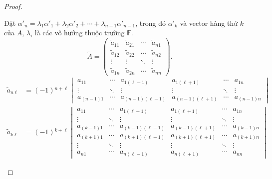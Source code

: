 \documentclass[class=linearalgebra,crop=false]{standalone}
\begin{document}
\begin{proof}
\begin{enumerate}[label = \textbf{Trường hợp \arabic*.},itemindent=2cm]
              \par Đặt $\alpha'_{n} = \lambda_{1}\alpha'_{1} + \lambda_{2}\alpha'_{2} + \cdots + \lambda_{n-1}\alpha'_{n-1}$, trong đó $\alpha'_{k}$ và vector hàng thứ $k$ của $A$, $\lambda_{i}$ là các vô hướng thuộc trường $\mathbb{F}$.
              \[
                  \tilde{A} =
                  \begin{pmatrix}
                      \tilde{a}_{11} & \tilde{a}_{21} & \cdots & \tilde{a}_{n1} \\
                      \tilde{a}_{12} & \tilde{a}_{22} & \cdots & \tilde{a}_{n2} \\
                      \vdots         & \vdots         & \ddots & \vdots         \\
                      \tilde{a}_{1n} & \tilde{a}_{2n} & \cdots & \tilde{a}_{nn}
                  \end{pmatrix}.
              \]
              \begin{align*}
                  \tilde{a}_{n\ell} & = (-1){}^{n+\ell}
                  \begin{vmatrix}
                      a_{11}     & \cdots & a_{1(\ell-1)}     & a_{1(\ell+1)}     & \cdots & a_{1n}     \\
                      \vdots     & \ddots & \vdots            & \vdots            & \ddots & \vdots     \\
                      a_{(n-1)1} & \cdots & a_{(n-1)(\ell-1)} & a_{(n-1)(\ell+1)} & \cdots & a_{(n-1)n}
                  \end{vmatrix}                             \\
                  \tilde{a}_{k\ell} & = (-1){}^{k+\ell}
                  \begin{vmatrix}
                      a_{11}     & \cdots & a_{1(\ell-1)}     & a_{1(\ell+1)}     & \cdots & a_{1n}     \\
                      \vdots     & \ddots & \vdots            & \vdots            & \ddots & \vdots     \\
                      a_{(k-1)1} & \cdots & a_{(k-1)(\ell-1)} & a_{(k-1)(\ell+1)} & \cdots & a_{(k-1)n} \\
                      a_{(k+1)1} & \cdots & a_{(k+1)(\ell-1)} & a_{(k+1)(\ell+1)} & \cdots & a_{(k+1)n} \\
                      \vdots     & \ddots & \vdots            & \vdots            & \ddots & \vdots     \\
                      a_{n1}     & \cdots & a_{n(\ell-1)}     & a_{n(\ell+1)}     & \cdots & a_{nn}

\end{vmatrix}
\end{align*}
\end{enumerate}
\end{proof}
\end{document}

